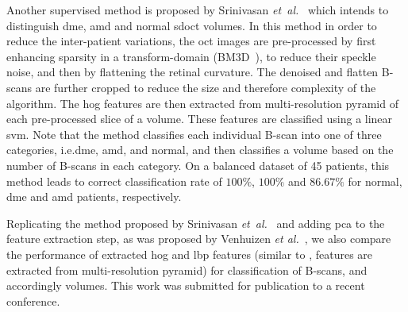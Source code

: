Another supervised method is proposed by Srinivasan \textit{et~al.}~\cite{Srinivasan2014} which intends to distinguish \gls{dme}, \gls{amd} and normal \gls{sdoct} volumes.
In this method in order to reduce the inter-patient variations, the \gls{oct} images are pre-processed by first enhancing sparsity in a transform-domain (BM3D~\cite{dabov2007image}), to reduce their speckle noise, and then by flattening the retinal curvature.
 The denoised and flatten B-scans are further cropped to reduce the size and therefore complexity of the algorithm.
The \gls{hog} features are then extracted from multi-resolution pyramid of each pre-processed slice of a volume.
These features are classified using a linear \gls{svm}.
Note that the method classifies each individual B-scan into one of three categories, i.e.\gls{dme}, \gls{amd}, and normal, and then classifies a volume based on the number of B-scans in each category.
On a balanced dataset of 45 patients, this method leads to correct classification rate of $100 \%$, $100 \%$ and $86.67 \%$ for normal, \gls{dme} and \gls{amd} patients, respectively.


Replicating the method proposed by Srinivasan \textit{et~al.}~\cite{Srinivasan2014} and adding \gls{pca} to the feature extraction step, as was proposed by Venhuizen \textit{et al.}~\cite{Venhuizen2015}, we also compare the performance of extracted \gls{hog} and \gls{lbp} features (similar to \cite{Srinivasan2014}, features are extracted from multi-resolution pyramid) for classification of B-scans, and accordingly volumes.
{\color{red}This work was submitted for publication to a recent conference.}

